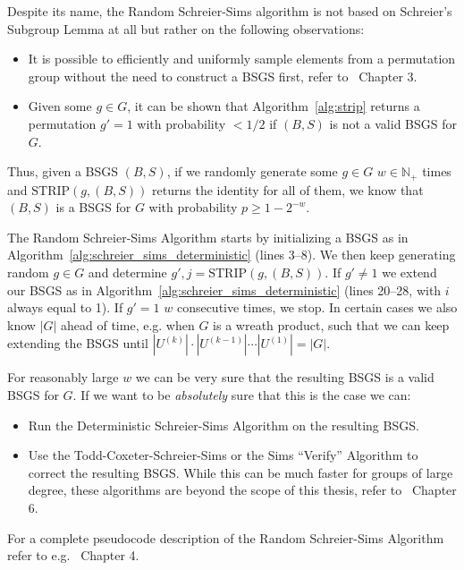 Despite its name, the Random Schreier-Sims algorithm is not based on Schreier's
Subgroup Lemma at all but rather on the following observations:

\begin{itemize}
  \item It is possible to efficiently and uniformly sample elements from a
        permutation group without the need to construct a BSGS first, refer
        to~\cite{Holt} Chapter 3.

  \item Given some $g \in G$, it can be shown that Algorithm~\ref{alg:strip}
        returns a permutation $g' = 1$ with probability
        $< 1/2$ if $(B,S)$ is not a valid BSGS for $G$.
\end{itemize}

\noindent
Thus, given a BSGS $(B,S)$, if we randomly generate some $g \in G$ $w \in
\mathbb{N}_+$ times and $\mathrm{STRIP}(g, (B,S))$ returns the identity for all
of them, we know that $(B,S)$ is a BSGS for $G$ with probability $p \ge 1 -
2^{-w}$.

The Random Schreier-Sims Algorithm starts by initializing a BSGS as in
Algorithm~\ref{alg:schreier_sims_deterministic} (lines 3--8).  We then keep
generating random $g \in G$ and determine $g', j = \mathrm{STRIP}(g, (B,S))$.
If $g' \ne 1$ we extend our BSGS as in
Algorithm~\ref{alg:schreier_sims_deterministic}  (lines 20--28, with $i$ always
equal to 1). If $g' = 1$ $w$ consecutive times, we stop.  In certain cases we
also know $|G|$ ahead of time, e.g. when $G$ is a wreath product, such that we
can keep extending the BSGS until $|U^{(k)}| \cdot |U^{(k-1)}| \cdots |U^{(1)}|
= |G|$.

For reasonably large $w$ we can be very sure that the resulting BSGS is a valid
BSGS for $G$. If we want to be \textit{absolutely} sure that this is the case
we can:

\begin{itemize}
  \item Run the Deterministic Schreier-Sims Algorithm on the resulting BSGS.
  \item Use the Todd-Coxeter-Schreier-Sims or the Sims ``Verify'' Algorithm
        to correct the resulting BSGS. While this can be much faster for groups of
        large degree, these algorithms are beyond the scope of this
        thesis, refer to~\cite{Holt} Chapter 6.
\end{itemize}

\noindent
For a complete pseudocode description of the Random Schreier-Sims Algorithm refer
to e.g.~\cite{Holt} Chapter 4.
